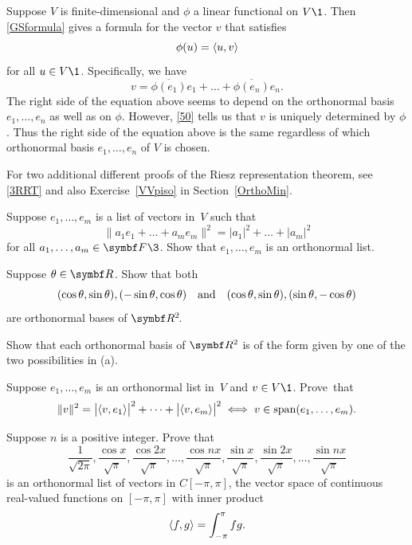 Suppose $V$ is finite-dimensional and $\phi$ a linear functional on $V\1$. Then \ref{GSformula} gives a formula for the vector $v$ that satisfies
\[
\phi(u) = \ip{u, v}
\]
for all $u \in V\1$. Specifically, we have
 \[
 v = \overline{\phi(e_1)} e_1  + \dots + \overline{\phi(e_n)} e_n.
\]
The right side of the equation above seems to depend on the orthonormal basis $e_1, \dots, e_n$ as well as on $\phi$. However, \ref{50} tells us that $v$ is uniquely determined by $\phi$. Thus the right side of the equation above is the same regardless of which orthonormal basis $e_1, \dots, e_n$ of $V$ is chosen.

For two additional different proofs of the Riesz representation theorem, see \ref{3RRT} and also Exercise~\ref{VVpiso} in Section~\ref{OrthoMin}.

\begin{exercises}

\exercise
Suppose $e_1, \dots, e_m$ is a list of vectors in~$V$ such that
\[
\| a_1 e_1 + \dots + a_m e_m \|^2 = | a_1|^2 + \dots + |a_m|^2
\]
for all $a_1, \dots, a_m \in \F{}\3$. Show that $e_1, \dots, e_m$ is an orthonormal list.


\exercise
\begin{SUBtheorem}
\item
Suppose $\theta \in \R{}$. Show that both
\[
(\cos \theta, \sin \theta), (-\sin \theta, \cos \theta) \andd (\cos \theta, \sin \theta), (\sin \theta, -\cos \theta)
\]
are orthonormal bases of $\RR2$.
\item
Show that each orthonormal basis of $\R2$ is of the form given by one of the two possibilities in (a).
\end{SUBtheorem}


\exercise
Suppose $e_1, \dots, e_m$ is an orthonormal list in~$V$ and $v \in V\1$.  Prove~that
\[
\|v\|^2 = \abs[\big]{ \ip{v, e_1} }^2 + \dots + \abs[\big]{ \ip{v, e_m} }^2 \iff v \in \Span(e_1, \dots, e_m).
\]
\exercisedisplayend


\exercise
Suppose $n$ is a positive integer.  Prove that \label{8Fourier}
\[
\frac{1}{\sqrt{2\pi}}, \frac{\cos x}{\sqrt{\pi}}, \frac{\cos 2x}{\sqrt{\pi}}, \dots,
\frac{\cos nx}{\sqrt{\pi}}, \frac{\sin x}{\sqrt{\pi}}, \frac{\sin 2x}{\sqrt{\pi}}, \dots,
\frac{\sin nx}{\sqrt{\pi}}
\]
is an orthonormal list of vectors in $C[-\pi,\pi]$, the vector space of
continuous real-valued functions on $[-\pi,\pi]$ with inner product
\[
\ip{f, g} = \int_{-\pi}^{\pi} fg.
\]



\end{exercises}

